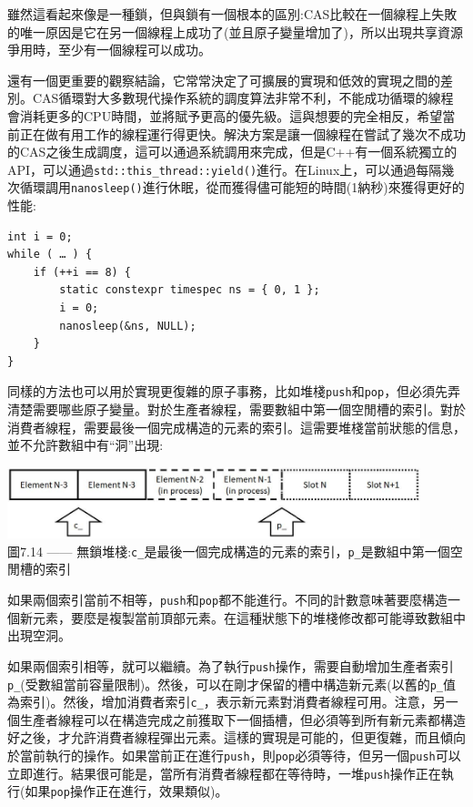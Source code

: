 雖然這看起來像是一種鎖，但與鎖有一個根本的區別:CAS比較在一個線程上失敗的唯一原因是它在另一個線程上成功了(並且原子變量增加了)，所以出現共享資源爭用時，至少有一個線程可以成功。

還有一個更重要的觀察結論，它常常決定了可擴展的實現和低效的實現之間的差別。CAS循環對大多數現代操作系統的調度算法非常不利，不能成功循環的線程會消耗更多的CPU時間，並將賦予更高的優先級。這與想要的完全相反，希望當前正在做有用工作的線程運行得更快。解決方案是讓一個線程在嘗試了幾次不成功的CAS之後生成調度，這可以通過系統調用來完成，但是C++有一個系統獨立的API，可以通過\texttt{std::this\_thread::yield()}進行。在Linux上，可以通過每隔幾次循環調用\texttt{nanosleep()}進行休眠，從而獲得儘可能短的時間(1納秒)來獲得更好的性能:

\begin{lstlisting}[style=styleCXX]
int i = 0;
while ( … ) {
	if (++i == 8) {
		static constexpr timespec ns = { 0, 1 };
		i = 0;
		nanosleep(&ns, NULL);
	}
}
\end{lstlisting}

同樣的方法也可以用於實現更復雜的原子事務，比如堆棧\texttt{push}和\texttt{pop}，但必須先弄清楚需要哪些原子變量。對於生產者線程，需要數組中第一個空閒槽的索引。對於消費者線程，需要最後一個完成構造的元素的索引。這需要堆棧當前狀態的信息，並不允許數組中有“洞”出現:

\begin{center}
\includegraphics[width=0.9\textwidth]{content/2/chapter7/images/14.jpg}\\ 
圖7.14 —— 無鎖堆棧:\texttt{c\_}是最後一個完成構造的元素的索引，\texttt{p\_}是數組中第一個空閒槽的索引
\end{center}

如果兩個索引當前不相等，\texttt{push}和\texttt{pop}都不能進行。不同的計數意味著要麼構造一個新元素，要麼是複製當前頂部元素。在這種狀態下的堆棧修改都可能導致數組中出現空洞。

如果兩個索引相等，就可以繼續。為了執行\texttt{push}操作，需要自動增加生產者索引\texttt{p\_}(受數組當前容量限制)。然後，可以在剛才保留的槽中構造新元素(以舊的\texttt{p\_}值為索引)。然後，增加消費者索引\texttt{c\_}，表示新元素對消費者線程可用。注意，另一個生產者線程可以在構造完成之前獲取下一個插槽，但必須等到所有新元素都構造好之後，才允許消費者線程彈出元素。這樣的實現是可能的，但更復雜，而且傾向於當前執行的操作。如果當前正在進行\texttt{push}，則\texttt{pop}必須等待，但另一個\texttt{push}可以立即進行。結果很可能是，當所有消費者線程都在等待時，一堆\texttt{push}操作正在執行(如果\texttt{pop}操作正在進行，效果類似)。

